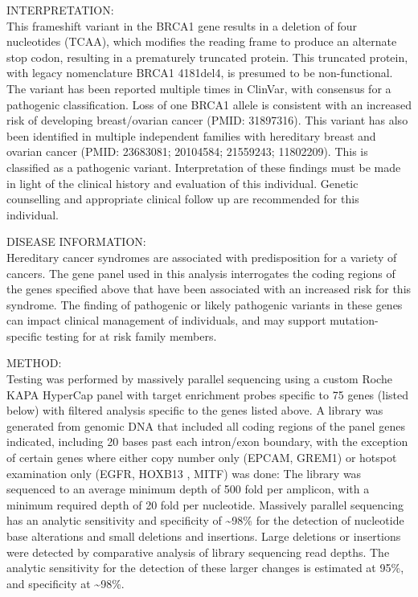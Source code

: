 \documentclass[10pt]{article}
\begin{document}
INTERPRETATION: \\
This frameshift variant in the BRCA1 gene results in a deletion of four nucleotides (TCAA), which modifies the reading frame to produce an alternate stop codon, resulting in a prematurely truncated protein. This truncated protein, with legacy nomenclature BRCA1 4181del4, is presumed to be non-functional. The variant has been reported multiple times in ClinVar, with consensus for a pathogenic classification. Loss of one BRCA1 allele is consistent with an increased risk of developing breast/ovarian cancer (PMID: 31897316). This variant has also been identified in multiple independent families with hereditary breast and ovarian cancer (PMID: 23683081; 20104584; 21559243; 11802209). This is classified as a pathogenic variant.
Interpretation of these findings must be made in light of the clinical history and evaluation of this individual. Genetic counselling and appropriate clinical follow up are recommended for this individual.

DISEASE INFORMATION: \\
Hereditary cancer syndromes are associated with predisposition for a variety of cancers. The gene panel used in this analysis interrogates the coding regions of the genes specified above that have been associated with an increased risk for this syndrome. The finding of pathogenic or likely pathogenic variants in these genes can impact clinical management of individuals, and may support mutation-specific testing for at risk family members.

METHOD: \\
Testing was performed by massively parallel sequencing using a custom Roche KAPA HyperCap panel with target enrichment probes specific to 75 genes (listed below) with filtered analysis specific to the genes listed above. A library was generated from genomic DNA that included all coding regions of the panel genes indicated, including 20 bases past each intron/exon boundary, with the exception of certain genes where either copy number only (EPCAM, GREM1) or hotspot examination only (EGFR, HOXB13 , MITF) was done: The library was sequenced to an average minimum depth of 500 fold per amplicon, with a minimum required depth of 20 fold per nucleotide. Massively parallel sequencing has an analytic sensitivity and specificity of \textasciitilde 98\% for the detection of nucleotide base alterations and small deletions and insertions. Large deletions or insertions were detected by comparative analysis of library sequencing read depths. The analytic sensitivity for the detection of these larger changes is estimated at 95\%, and specificity at \textasciitilde 98\%.
\end{document}

